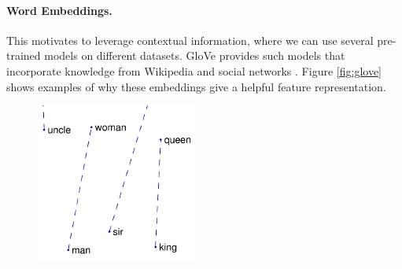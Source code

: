 \paragraph{Word Embeddings.} This motivates to leverage contextual information, where we can use several pre-trained models on different datasets. GloVe provides such models that incorporate knowledge from Wikipedia and social networks \cite{pennington2014glove}. Figure \ref{fig:glove} shows examples of why these embeddings give a helpful feature representation. 

\begin{figure}[h]
\centering
\begin{minipage}{.3\textwidth}
  \centering
  \includegraphics[width=\linewidth]{images/glove_mw}
\end{minipage}
\begin{minipage}{.3\textwidth}
  \centering

\end{minipage}
\end{figure}

